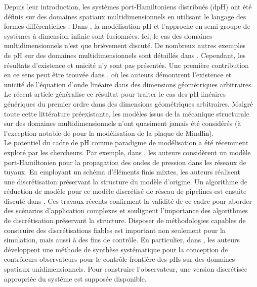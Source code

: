 Depuis leur introduction, les systèmes port-Hamiltoniens distribués (dpH) ont été définis sur des domaines spatiaux multidimensionnels en utilisant le langage des formes différentielles \cite{vanderschaft2002}. Dans \cite{villegas2007}, la modélisation pH et l'approche en semi-groupe de systèmes à dimension infinie sont fusionnées. Ici, le cas des domaines multidimensionnels n'est que brièvement discuté. De nombreux autres exemples de pH sur des domaines multidimensionnels sont détaillés dans \cite[Chapitre 4]{duindam2009}. Cependant, les résultats d'existence et unicité n'y sont pas présentés. Une première contribution en ce sens peut être trouvée dans \cite{zwart2015wave}, où les auteurs démontrent l'existence et unicité de l'équation d'onde linéaire dans des dimensions géométriques arbitraires. Le récent article \cite{skrepek2019wellposedness} généralise ce résultat pour traiter le cas des pH linéaires génériques du premier ordre dans des dimensions géométriques arbitraires. Malgré toute cette littérature préexistante, les modèles issus de la mécanique structurale sur des domaines multidimensionnels n'ont quasiment jamais été considérés (à l'exception notable de \cite{macchelli2005mindlin} pour la modélisation de la plaque de Mindlin). \\

Le potentiel du cadre de pH comme paradigme de modélisation a été récemment exploré par les chercheurs. Par exemple, dans \cite{egger2018damped}, les auteurs considèrent un modèle port-Hamiltonien pour la propagation des ondes de pression dans les réseaux de tuyaux. En employant un schéma d'éléments finis mixtes, les auteurs réalisent une discrétisation préservant la structure du modèle d'origine. Un algorithme de réduction de modèle pour ce modèle discrétisé de réseau de pipelines est ensuite discuté dans \cite{egger2018}. Ces travaux récents confirment la validité de ce cadre pour aborder des scénarios d'application complexes et soulignent l'importance des algorithmes de discrétisation préservant la structure. Disposer de méthodologies capables de construire des discrétisations fiables est important non seulement pour la simulation, mais aussi à des fins de contrôle. En particulier, dans \cite{toledo2020}, les auteurs développent une méthode de synthèse systématique pour la conception de contrôleurs-observateurs pour le contrôle frontière des pHs sur des domaines spatiaux unidimensionnels. Pour construire l'observateur, une version discrétisée appropriée du système est supposée disponible. \\

